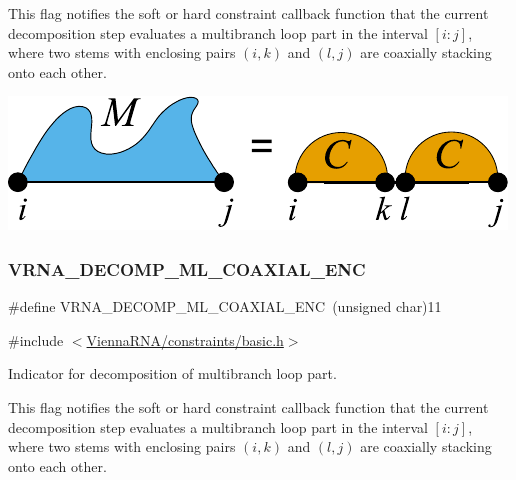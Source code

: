 This flag notifies the soft or hard constraint callback function that the current decomposition step evaluates a multibranch loop part in the interval $[i:j]$, where two stems with enclosing pairs $(i,k)$ and $(l,j)$ are coaxially stacking onto each other.

 
\begin{DoxyImageNoCaption}
  \mbox{\includegraphics[width=\textwidth,height=\textheight/2,keepaspectratio=true]{decomp_ml_coaxial}}
\end{DoxyImageNoCaption}
 \mbox{\label{group__constraints_ga0224727f7b8ad2f23eb0a3fd28d8b3fb}} 
\subsubsection{\texorpdfstring{V\+R\+N\+A\+\_\+\+D\+E\+C\+O\+M\+P\+\_\+\+M\+L\+\_\+\+C\+O\+A\+X\+I\+A\+L\+\_\+\+E\+NC}{VRNA\_DECOMP\_ML\_COAXIAL\_ENC}}
{\footnotesize\ttfamily \#define V\+R\+N\+A\+\_\+\+D\+E\+C\+O\+M\+P\+\_\+\+M\+L\+\_\+\+C\+O\+A\+X\+I\+A\+L\+\_\+\+E\+NC~(unsigned char)11}



{\ttfamily \#include $<$\hyperlink{constraints_2basic_8h}{Vienna\+R\+N\+A/constraints/basic.\+h}$>$}



Indicator for decomposition of multibranch loop part. 

This flag notifies the soft or hard constraint callback function that the current decomposition step evaluates a multibranch loop part in the interval $[i:j]$, where two stems with enclosing pairs $(i,k)$ and $(l,j)$ are coaxially stacking onto each other.

